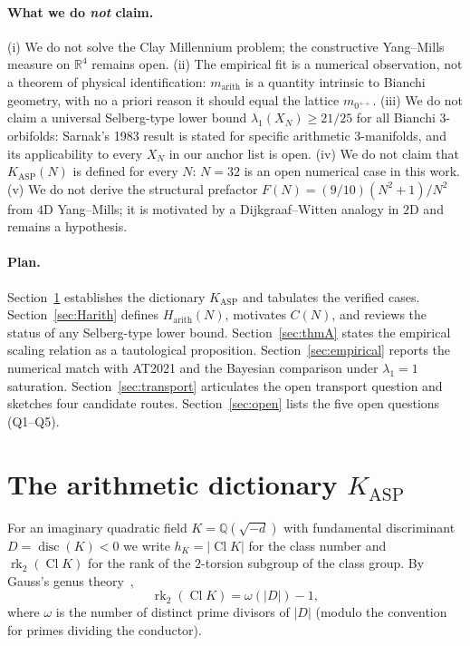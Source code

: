 \documentclass[11pt,a4paper]{article}
\theoremstyle{definition}
\DeclareMathOperator{\Cl}{Cl}
\DeclareMathOperator{\rk}{rk}
\DeclareMathOperator{\disc}{disc}
\newcommand{\KASP}{K_{\mathrm{ASP}}}
\newcommand{\Harith}{H_{\mathrm{arith}}}
\newcommand{\marith}{m_{\mathrm{arith}}}
\newcommand{\QQ}{\mathbb{Q}}
\newcommand{\RR}{\mathbb{R}}
\begin{document}
\paragraph{What we do \emph{not} claim.} (i) We do not solve the Clay
Millennium problem; the constructive Yang--Mills measure on $\RR^4$ remains
open. (ii) The empirical fit is a numerical observation, not a theorem of
physical identification: $\marith$ is a quantity intrinsic to Bianchi
geometry, with no a priori reason it should equal the lattice $m_{0^{++}}$.
(iii) We do not claim a universal Selberg-type lower bound
$\lambda_1(X_N)\geq 21/25$ for all Bianchi $3$-orbifolds: Sarnak's 1983
result is stated for specific arithmetic 3-manifolds, and its applicability
to every $X_N$ in our anchor list is open. (iv) We do not claim that
$\KASP(N)$ is defined for every $N$: $N=32$ is an open numerical case in
this work. (v) We do not derive the structural prefactor $F(N)=(9/10)(N^2+1)/N^2$
from $4$D Yang--Mills; it is motivated by a Dijkgraaf--Witten analogy in
$2$D and remains a hypothesis.

\paragraph{Plan.} Section~\ref{sec:dict} establishes the dictionary $\KASP$
and tabulates the verified cases. Section~\ref{sec:Harith} defines
$\Harith(N)$, motivates $C(N)$, and reviews the status of any Selberg-type
lower bound. Section~\ref{sec:thmA} states the empirical scaling relation
as a tautological proposition. Section~\ref{sec:empirical} reports the
numerical match with AT2021 and the Bayesian comparison under
$\lambda_1=1$ saturation. Section~\ref{sec:transport} articulates the open
transport question and sketches four candidate routes. Section~\ref{sec:open}
lists the five open questions (Q1--Q5).

\section{The arithmetic dictionary $\KASP$}\label{sec:dict}

For an imaginary quadratic field $K = \QQ(\sqrt{-d})$ with fundamental
discriminant $D = \disc(K) < 0$ we write $h_K = |\Cl K|$ for the class
number and $\rk_2(\Cl K)$ for the rank of the $2$-torsion subgroup of the
class group. By Gauss's genus theory~\cite[\S 3.B]{Cox1989},
\[
  \rk_2(\Cl K) = \omega(|D|) - 1,
\]
where $\omega$ is the number of distinct prime divisors of $|D|$
(modulo the convention for primes dividing the conductor).
\end{document}
